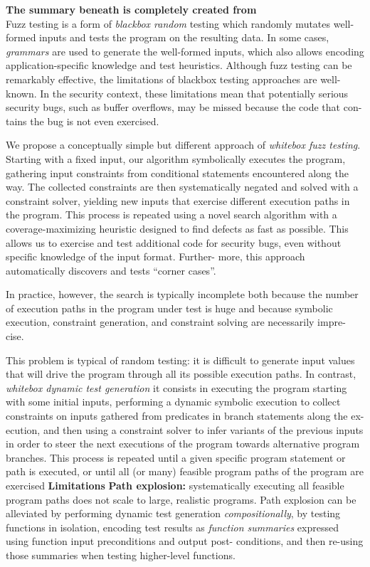 \textbf{The summary beneath is completely created from \cite{godefroid2008automated}}
\\

Fuzz testing is a form of \textit{blackbox random} testing which randomly mutates well-formed inputs and tests the program on the resulting data. 
In some cases, \textit{grammars} are used to generate the well-formed inputs, which also allows encoding application-specific knowledge and test heuristics. 
Although fuzz testing can be remarkably effective, the limitations of blackbox testing approaches are well-known.
In the security context, these limitations mean that potentially serious security bugs, such as buffer overflows, may be missed because the code that con- tains the bug is not even exercised.

We propose a conceptually simple but different approach of \textit{whitebox fuzz testing}.
Starting with a fixed input, our algorithm symbolically executes the program, gathering input constraints from conditional statements encountered along the way. 
The collected constraints are then systematically negated and solved with a constraint solver, yielding new inputs that exercise different execution paths in the program. This process is repeated using a novel search algorithm with a coverage-maximizing heuristic designed to find defects as fast as possible.
This allows us to exercise and test additional code for security bugs, even without specific knowledge of the input format. Further- more, this approach automatically discovers and tests ``corner cases''.

In practice, however, the search is typically incomplete both because the number of execution paths in the program under test is huge and because symbolic execution, constraint generation, and constraint solving are necessarily impre- cise.


This problem is typical of random testing: it is difficult to generate input values that will drive the program through all its possible execution paths.
In contrast, \textit{whitebox dynamic test generation} it consists in executing the program starting with some initial inputs, performing a dynamic symbolic execution to collect constraints on inputs gathered from predicates in branch statements along the ex- ecution, and then using a constraint solver to infer variants of the previous inputs in order to steer the next executions of the program towards alternative program branches. 
This process is repeated until a given specific program statement or path is executed, or until all (or many) feasible program paths of the program are exercised 
\textbf{Limitations}
\textbf{Path explosion:} systematically executing all feasible program paths does not scale to large, realistic programs. Path explosion can be alleviated by performing dynamic test generation \textit{compositionally}, by testing functions in isolation, encoding test results as \textit{function summaries} expressed using function input preconditions and output post- conditions, and then re-using those summaries when testing higher-level functions.

